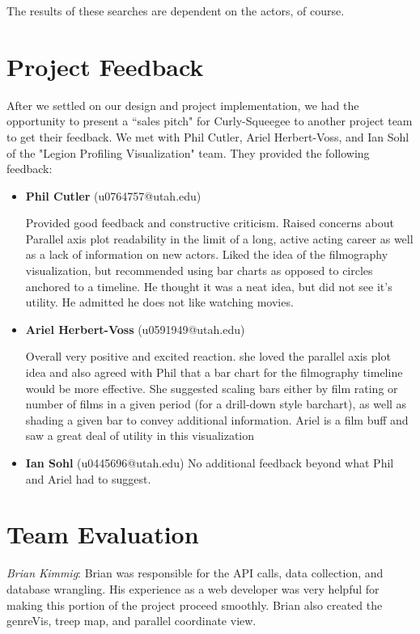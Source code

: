 \documentclass[12pt]{article}
\begin{document}
The results of these searches are dependent on the actors, of course.

\newpage

\section{Project Feedback} \label{sec:Projcet Feedback}

After we settled on our design and project implementation, we had the opportunity to present a ``sales pitch"  for Curly-Squeegee to another project team to get their feedback.  We met with Phil Cutler, Ariel Herbert-Voss, and Ian Sohl of the "Legion Profiling Visualization" team. They provided the following feedback:

\begin{itemize}
	\item \textbf{Phil Cutler} (u0764757@utah.edu)
	
	Provided good feedback and constructive criticism. Raised concerns about Parallel axis plot readability in the limit of a long, active acting career as well as a lack of information on new actors. Liked the idea of the filmography visualization, but recommended using bar charts as opposed to circles anchored to a timeline. He thought it was a neat idea, but did not see it's utility. He admitted he does not like watching movies.
	
	
	\item \textbf{Ariel Herbert-Voss} (u0591949@utah.edu)
	
	Overall very positive and excited reaction. she loved the parallel axis plot idea and also agreed with Phil that a bar chart for the filmography timeline would be more effective. She suggested scaling bars either by film rating or number of films in a given period (for a drill-down style barchart), as well as shading a given bar to convey additional information. Ariel is a film buff and saw a great deal of utility in this visualization
	
	\item \textbf{Ian Sohl} (u0445696@utah.edu)
		No additional feedback beyond what Phil and Ariel had to suggest.
\end{itemize}

\newpage

\section{Team Evaluation}

\textit{Brian Kimmig}: Brian was responsible for the API calls, data collection, and database wrangling. His experience as a web developer was very helpful for making this portion of the project proceed smoothly. Brian also created  the genreVis, treep map, and parallel coordinate view.
\end{document}
